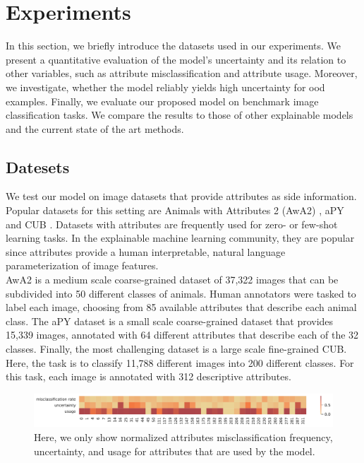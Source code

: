 \documentclass[a4paper,cleardoubleempty,BCOR1cm, 11pt]{report}
\begin{document}
\chapter{Experiments}
In this section, we briefly introduce the datasets used in our experiments. We present a quantitative evaluation of the model's uncertainty and its relation to other variables, such as attribute misclassification and attribute usage. Moreover, we investigate, whether the model reliably yields high uncertainty for ood examples. Finally, we evaluate our proposed model on benchmark image classification tasks. We compare the results to those of other explainable models and the current state of the art methods.


\section{Datesets}
We test our model on image datasets that provide attributes as side information. Popular datasets for this setting are Animals with Attributes 2 (AwA2) \cite{8413121}, aPY \cite{farhadi2009describing} and CUB \cite{WahCUB_200_2011}. Datasets with attributes are frequently used for zero- or few-shot learning tasks. In the explainable machine learning community, they are popular since attributes provide a human interpretable, natural language parameterization of image features.\\
AwA2 is a medium scale coarse-grained dataset of 37,322 images that can be subdivided into 50 different classes of animals. Human annotators were tasked to label each image, choosing from 85 available attributes that describe each animal class. The aPY dataset is a small scale coarse-grained dataset that provides 15,339 images, annotated with 64 different attributes that describe each of the 32 classes. Finally, the most challenging dataset is a large scale fine-grained CUB. Here, the task is to classify 11,788 different images into 200 different classes. For this task, each image is annotated with 312 descriptive attributes.

\begin{figure}[t!]
	\centering
	\includegraphics[width=1\textwidth]{images/attr_heatmap_short.pdf} 
	\caption{Here, we only show normalized attributes misclassification frequency, uncertainty, and usage for attributes that are used by the model.}
	\label{fig:less_attrs}
\end{figure}
\end{document}
